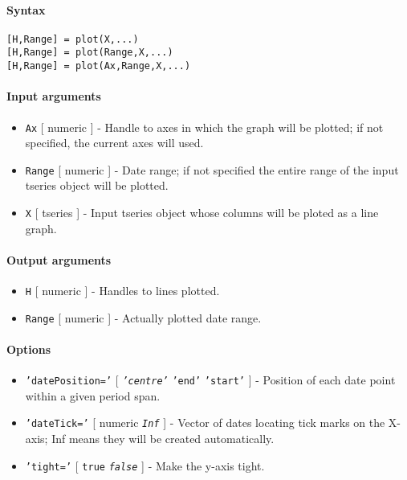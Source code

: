 


	\paragraph{Syntax}

\begin{verbatim}
[H,Range] = plot(X,...)
[H,Range] = plot(Range,X,...)
[H,Range] = plot(Ax,Range,X,...)
\end{verbatim}

\paragraph{Input arguments}

\begin{itemize}
\item
  \texttt{Ax} {[} numeric {]} - Handle to axes in which the graph will
  be plotted; if not specified, the current axes will used.
\item
  \texttt{Range} {[} numeric {]} - Date range; if not specified the
  entire range of the input tseries object will be plotted.
\item
  \texttt{X} {[} tseries {]} - Input tseries object whose columns will
  be ploted as a line graph.
\end{itemize}

\paragraph{Output arguments}

\begin{itemize}
\item
  \texttt{H} {[} numeric {]} - Handles to lines plotted.
\item
  \texttt{Range} {[} numeric {]} - Actually plotted date range.
\end{itemize}

\paragraph{Options}

\begin{itemize}
\item
  \texttt{'datePosition='} {[} \emph{\texttt{'centre'}} \textbar{}
  \texttt{'end'} \textbar{} \texttt{'start'} {]} - Position of each date
  point within a given period span.
\item
  \texttt{'dateTick='} {[} numeric \textbar{} \emph{\texttt{Inf}} {]} -
  Vector of dates locating tick marks on the X-axis; Inf means they will
  be created automatically.
\item
  \texttt{'tight='} {[} \texttt{true} \textbar{} \emph{\texttt{false}}
  {]} - Make the y-axis tight.
\end{itemize}

